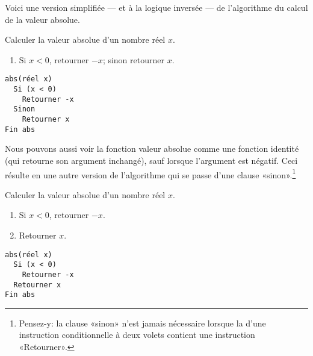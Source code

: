 Voici une version simplifiée --- et à la logique inversée --- de
l'algorithme du calcul de la valeur absolue.

\begingroup
\addtocounter{algorithme}{-1}
\renewcommand{\thealgorithme}{\ref*{algo:algorithmes:abs}a}
\begin{algorithme}
  \label{algo:algorithmes:abs:simplifie}
  Calculer la valeur absolue d'un nombre réel $x$.

  \noindent
  \begin{minipage}[t]{0.48\linewidth}
    \begin{enumerate}
    \item Si $x < 0$, retourner $-x$; sinon retourner $x$.
    \end{enumerate}
  \end{minipage}
  \hfill
  \begin{minipage}[t]{0.48\linewidth}
    \begin{Schunk}
\begin{Verbatim}
abs(réel x)
  Si (x < 0)
    Retourner -x
  Sinon
    Retourner x
Fin abs
\end{Verbatim}
    \end{Schunk}
  \end{minipage}
\end{algorithme}
\endgroup

Nous pouvons aussi voir la fonction valeur absolue comme une fonction
identité (qui retourne son argument inchangé), sauf lorsque l'argument
est négatif. Ceci résulte en une autre version de l'algorithme qui se
passe d'une clause «sinon».\footnote{%
  Pensez-y: la clause «sinon» n'est jamais nécessaire lorsque la
   d'une instruction conditionnelle à deux volets
  contient une instruction «Retourner».}

\begingroup
\addtocounter{algorithme}{-1}
\renewcommand{\thealgorithme}{\ref*{algo:algorithmes:abs}a}
\begin{algorithme}
  \label{algo:algorithmes:abs:simplifie}
  Calculer la valeur absolue d'un nombre réel $x$.

  \noindent
  \begin{minipage}[t]{0.48\linewidth}
    \begin{enumerate}
    \item Si $x < 0$, retourner $-x$.
    \item Retourner $x$.
    \end{enumerate}
  \end{minipage}
  \hfill
  \begin{minipage}[t]{0.48\linewidth}
    \begin{Schunk}
\begin{Verbatim}
abs(réel x)
  Si (x < 0)
    Retourner -x
  Retourner x
Fin abs
\end{Verbatim}
    \end{Schunk}
  \end{minipage}
\end{algorithme}
\endgroup

